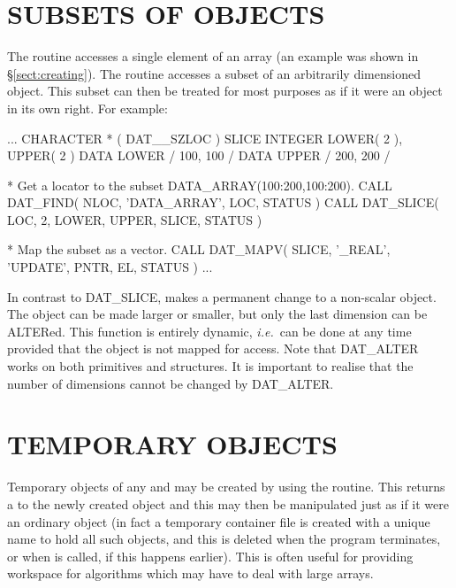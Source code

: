 \documentclass[twoside,11pt]{starlink}
\providecommand{\st}[1]{{\emph{#1}}}
\begin{document}
\section{SUBSETS OF OBJECTS}

The routine  accesses a single element of
an array (an example was shown in \S\ref{sect:creating}). The routine
 accesses a subset of an arbitrarily
dimensioned object. This subset can then be treated for most purposes
as if it were an object in its own right. For example:

\begin{small}
\begin{terminalv}
      ...
      CHARACTER * ( DAT__SZLOC ) SLICE
      INTEGER LOWER( 2 ), UPPER( 2 )
      DATA LOWER / 100, 100 /
      DATA UPPER / 200, 200 /

*  Get a locator to the subset DATA_ARRAY(100:200,100:200).
      CALL DAT_FIND( NLOC, 'DATA_ARRAY', LOC, STATUS )
      CALL DAT_SLICE( LOC, 2, LOWER, UPPER, SLICE, STATUS )

*  Map the subset as a vector.
      CALL DAT_MAPV( SLICE, '_REAL', 'UPDATE', PNTR, EL, STATUS )
      ...
\end{terminalv}
\end{small}

In contrast to DAT\_SLICE,  makes a
permanent change to a non-scalar object. The object can be made larger
or smaller, but only the last dimension can be ALTERed. This function
is entirely dynamic, \st{i.e.}\ can be done at any time provided that
the object is not mapped for access. Note that DAT\_ALTER works on
both primitives and structures. It is important to realise that the
number of dimensions cannot be changed by DAT\_ALTER.

\section{TEMPORARY OBJECTS}

Temporary objects of any  and  may be
created by using the  routine. This
returns a  to the newly created object and this may then be
manipulated just as if it were an ordinary object (in fact a temporary
container file is created with a unique name to hold all such objects,
and this is deleted when the program terminates, or when
 is called, if this happens
earlier). This is often useful for providing workspace for algorithms
which may have to deal with large arrays.
\end{document}
